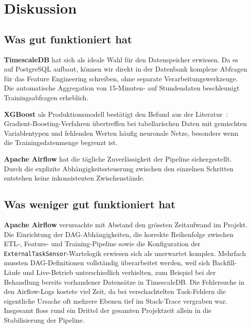 \documentclass[sigconf]{acmart}
\begin{document}
\section{Diskussion}

\subsection{Was gut funktioniert hat}

\textbf{TimescaleDB} hat sich als ideale Wahl f\"ur den Datenspeicher erwiesen.
Da es auf PostgreSQL aufbaut, k\"onnen wir direkt in der Datenbank komplexe
Abfragen f\"ur das Feature Engineering schreiben, ohne separate
Verarbeitungs\-werkzeuge.
Die automatische Aggregation von 15-Minuten- auf Stundendaten beschleunigt
Trainingsabfragen erheblich.

\textbf{XGBoost} als Produktions\-modell best\"atigt den Befund aus der
Literatur~\cite{Lago2021}: Gradient-Boosting-Verfahren \"ubertreffen bei
tabellarischen Daten mit gemischten Variablentypen und fehlenden Werten
h\"aufig neuronale Netze, besonders wenn die Trainingsdatenmenge
begrenzt ist.

\textbf{Apache Airflow} hat die t\"agliche Zuverl\"assigkeit der Pipeline
sichergestellt.
Durch die explizite Abh\"angigkeits\-steuerung zwischen den einzelnen
Schritten entstehen keine inkonsistenten Zwischenst\"ande.

\subsection{Was weniger gut funktioniert hat}

\textbf{Apache Airflow} verursachte mit Abstand den gr\"ossten Zeitaufwand
im Projekt.
Die Einrichtung der DAG-Abh\"angigkeiten, die korrekte Reihenfolge zwischen
ETL-, Feature- und Training-Pipeline sowie die Konfiguration der
\texttt{ExternalTaskSensor}-Wartelogik erwiesen sich als unerwartet komplex.
Mehrfach mussten DAG-Definitionen vollst\"andig \"uberarbeitet werden, weil
sich Backfill-L\"aufe und Live-Betrieb unterschiedlich verhielten, zum
Beispiel bei der Behandlung bereits vorhandener Datens\"atze in TimescaleDB.
Die Fehlersuche in den Airflow-Logs kostete viel Zeit, da bei verschachtelten
Task-Fehlern die eigentliche Ursache oft mehrere Ebenen tief im Stack-Trace
vergraben war.
Insgesamt floss rund ein Drittel der gesamten Projektzeit allein in die
Stabilisierung der Pipeline.
\end{document}
